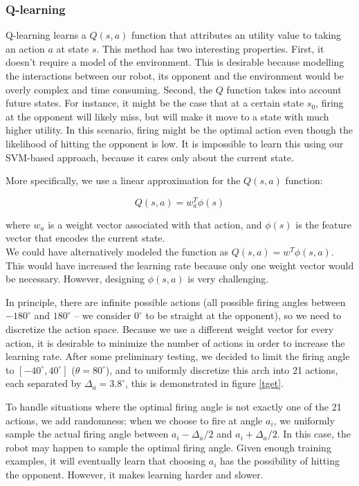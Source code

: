 \documentclass{article}
\theoremstyle{plain}
\theoremstyle{definition}
\theoremstyle{remark}
\begin{document}
\subsubsection*{Q-learning}
Q-learning \cite{watkins92a} learns a $Q(s, a)$ function that attributes an utility value to taking an action $a$ at state $s$. This method
has two interesting properties. First, it doesn't require a model of the environment. This is desirable because modelling the
interactions between our robot, its opponent and the environment would be overly complex and time consuming. Second, the $Q$ function
takes into account future states. For instance, it might be the case that
at a certain state $s_0$, firing at the opponent will likely miss, but will make it move to a state with much higher utility. In this scenario,
firing might be the optimal action even though the likelihood of hitting the opponent is low. It is impossible to learn this using our
SVM-based approach, because it cares only about the current state.

More specifically, we use a linear approximation for the $Q(s, a)$ function:

$$Q(s, a) = w_a^T\phi(s)$$

where $w_a$ is a weight vector associated with that action, and $\phi(s)$ is the feature vector that encodes the current state.\\

We could have alternatively modeled the function as $Q(s,a) = w^T\phi(s, a)$. This would have increased the learning rate because only
one weight vector would be necessary. However, designing $\phi(s, a)$ is very challenging.

In principle, there are infinite possible actions (all possible firing angles between $-180^{\circ} $ and $180^{\circ} $ -- we consider $0^{\circ}$ to be straight at the opponent),
so we need to discretize the
action space. Because we use a different weight vector for every action, it is desirable to minimize the number of actions in order
to increase the learning rate. After some preliminary testing, we decided to limit the firing angle to $[-40^{\circ}, 40^{\circ}]$ ($\theta = 80^{\circ}$), and to uniformly discretize this arch into
21 actions, each separated by $\Delta_a = 3.8^{\circ}$, this is demonstrated in figure \ref{tget}.

To handle situations where the optimal firing angle is not exactly one of the 21 actions, we add randomness: when we choose to fire at angle $a_i$, we uniformly sample the actual
firing angle between $a_i - \Delta_a/2$ and $a_i + \Delta_a/2$. In this case, the robot may happen to sample the optimal firing angle. Given enough training examples, it will
eventually learn that choosing $a_i$ has the possibility of hitting the opponent. However, it makes learning harder and slower.
\end{document}
